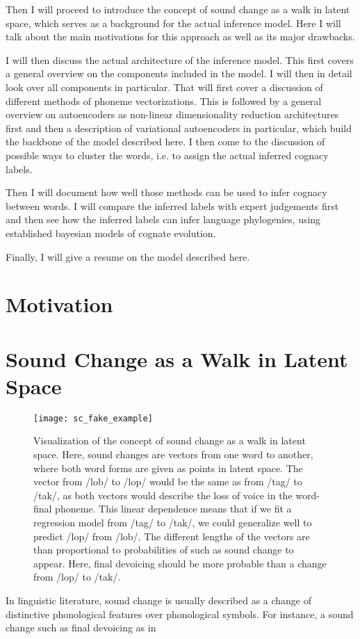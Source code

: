 \documentclass[8pt]{article}
\begin{document}
Then I will proceed to introduce the concept of sound change as a walk in latent space, which serves as a background for the actual inference model. Here I will talk about the main motivations for this approach as well as its major drawbacks. 


I will then discuss the actual architecture of the inference model. This first covers a general overview on the components included in the model. I will then in detail look over all components in particular. That will first cover a discussion of different methods of phoneme vectorizations. This is followed by a general overview on autoencoders as non-linear dimensionality reduction architectures first and then a description of variational autoencoders in particular, which build the backbone of the model described here. I then come to the discussion of possible ways to cluster the words, i.e. to assign the actual inferred cognacy labels.

Then I will document how well those methods can be used to infer cognacy between words. I will compare the inferred labels with expert judgements first and then see how the inferred labels can infer language phylogenies, using established bayesian models of cognate evolution.

Finally, I will give a resume on the model described here.

\section{Motivation}

\section{Sound Change as a Walk in Latent Space}
\label{Sound Change as a Walk in Latent Space}

\begin{figure}[h]
\begin{center}
\texttt{[image: sc\_fake\_example]} 
\caption{Visualization of the concept of sound change as a walk in latent space. Here, sound changes are vectors from one word to another, where both word forms are given as points in latent space. The vector from /lob/ to /lop/ would be the same as from /tag/ to /tak/, as both vectors would describe the loss of voice in the word-final phoneme. This linear dependence means that if we fit a regression model from /tag/ to /tak/, we could generalize well to predict /lop/ from /lob/. The different lengths of the vectors are than proportional to probabilities of such as sound change to appear. Here, final devoicing should be more probable than a change from /lop/ to /tak/. }
\label{default}
\end{center}
\end{figure}
In linguistic literature, sound change is usually described as a change of distinctive phonological features over phonological symbols. For instance, a sound change such as final devoicing as in 
\end{document}
